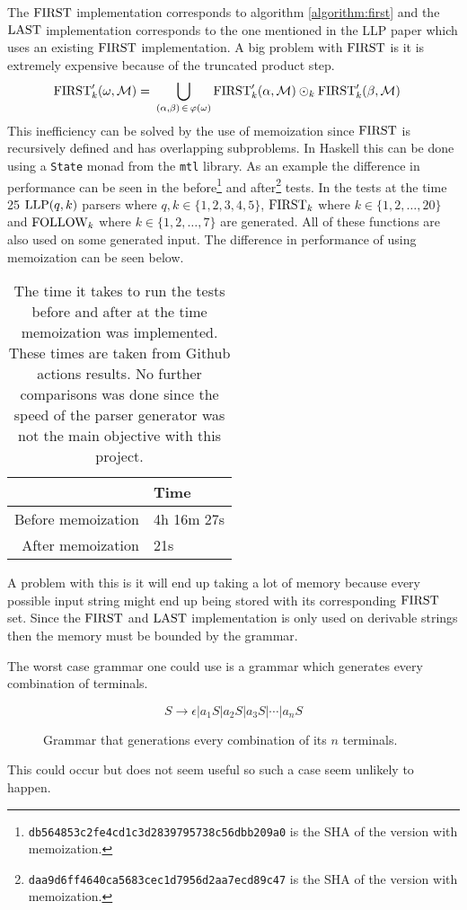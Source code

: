 The $\text{FIRST}$ implementation corresponds to algorithm \ref{algorithm:first} and the $\text{LAST}$ implementation corresponds to the one mentioned in the LLP paper \cite[12]{Vagner2007} which uses an existing $\text{FIRST}$ implementation. A big problem with $\text{FIRST}$ is it is extremely expensive because of the truncated product step.
\begin{align*}
    \text{FIRST}'_k(\omega, \mathcal{M}) =&\,\, \bigcup_{(\alpha, \beta) \, \in \, \varphi(\omega)} \text{FIRST}'_k(\alpha, \mathcal{M}) \odot_k \text{FIRST}'_k(\beta, \mathcal{M})
\end{align*}
This inefficiency can be solved by the use of memoization since $\text{FIRST}$ is recursively defined and has overlapping subproblems. In Haskell this can be done using a \lstinline|State| monad from the \lstinline|mtl| library. As an example the difference in performance can be seen in the before\footnote{\texttt{db564853c2fe4cd1c3d2839795738c56dbb209a0} is the SHA of the version with memoization.} and after\footnote{\texttt{daa9d6ff4640ca5683cec1d7956d2aa7ecd89c47} is the SHA of the version with memoization.} tests. In the tests at the time 25 $\text{LLP}(q,k)$ parsers where $q, k \in \{1, 2, 3, 4, 5\}$, $\text{FIRST}_k$ where $k \in \{1, 2, \dots, 20\}$ and $\text{FOLLOW}_k$ where $k \in \{1, 2, \dots, 7\}$ are generated. All of these functions are also used on some generated input. The difference in performance of using memoization can be seen below. 
\begin{table}[H]
    \centering
    \begin{tabular}{r|l}
         & Time \\ \hline
        Before memoization & 4h 16m 27s \\
        After memoization & 21s
    \end{tabular}
    \caption{The time it takes to run the tests before and after at the time memoization was implemented. These times are taken from Github actions results. No further comparisons was done since the speed of the parser generator was not the main objective with this project.}
\end{table}
\noindent A problem with this is it will end up taking a lot of memory because every possible input string might end up being stored with its corresponding $\text{FIRST}$ set. Since the $\text{FIRST}$ and $\text{LAST}$ implementation is only used on derivable strings then the memory must be bounded by the grammar.

The worst case grammar one could use is a grammar which generates every combination of terminals.
\begin{figure}
    \begin{equation}
        \label{fig:combination-grammar}
        S \to \epsilon | a_1 S | a_2 S | a_3 S | \cdots | a_n S
    \end{equation}
    \caption{Grammar that generations every combination of its $n$ terminals.}    
\end{figure}
This could occur but does not seem useful so such a case seem unlikely to happen.